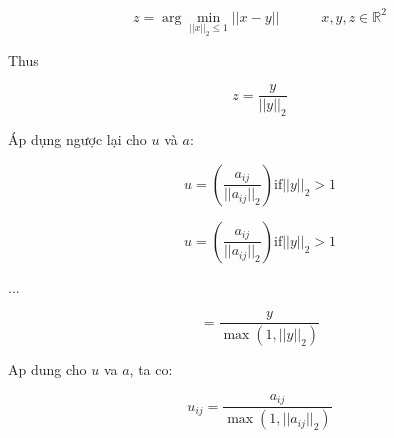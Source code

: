 \documentclass{article}
\begin{document}
\begin{equation}
    z = \arg \min_{|| x ||_2 \leq 1} ||x - y|| \quad \quad \quad x, y, z \in \mathbb{R}^2
\end{equation}

Thus

\begin{equation}
    z = \frac{y}{|| y ||_2}
\end{equation}


Áp dụng ngược lại cho $u$ và $a$:

\begin{equation}
    u = \left( \frac{a_{ij}}{|| a_{ij} ||_2} \right)  \text{if} ||y||_2 > 1
\end{equation}


\begin{equation}
    u = \left( \frac{a_{ij}}{|| a_{ij} ||_2} \right)  \text{if} ||y||_2 > 1
\end{equation}


...

\begin{equation}
    = \frac{y}{\max(1, ||y||_2)}
\end{equation}

Ap dung cho $u$ va $a$, ta co:

\begin{equation}
    u_{ij} = \frac{a_{ij}}{\max(1, ||a_{ij}||_2)}
\end{equation}



\printbibliography
\end{document}
